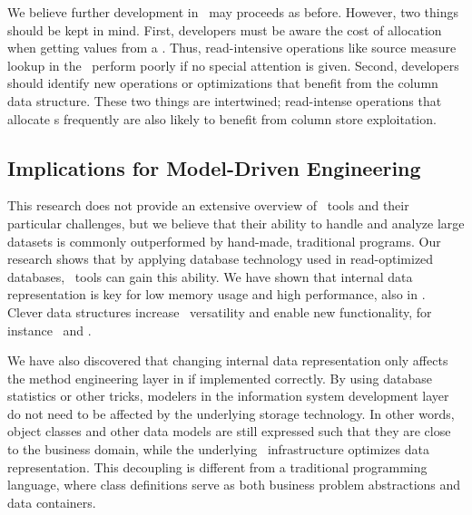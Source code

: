 We believe further development in \gap~may proceeds as before. However, two things should be kept in mind. First, developers must be aware the cost of  allocation when getting values from a . Thus, read-intensive operations like source measure lookup in the \tpchdl~perform poorly if no special attention is given. Second, developers should identify new operations or optimizations that benefit from the column data structure. These two things are intertwined; read-intense operations that allocate s frequently are also likely to benefit from column store exploitation.

\subsection{Implications for Model-Driven Engineering}
\label{sub:Implications for Model-Driven Engineering}
This research does not provide an extensive overview of \mdd~tools and their particular challenges, but we believe that their ability to handle and analyze large datasets is commonly outperformed by hand-made, traditional programs. Our research shows that by applying database technology used in read-optimized databases, \mde~tools can gain this ability. We have shown that internal data representation is key for low memory usage and high performance, also in \mdd. Clever data structures increase \mde~versatility and enable new functionality, for instance \bi~and \bd.

We have also discovered that changing internal data representation only affects the method engineering layer in \mde if implemented correctly. By using database statistics or other tricks, modelers in the information system development layer do not need to be affected by the underlying storage technology. In other words, object classes and other data models are still expressed such that they are close to the business domain, while the underlying \mde~infrastructure optimizes data representation. This decoupling is different from a traditional programming language, where class definitions serve as both business problem abstractions and data containers.


